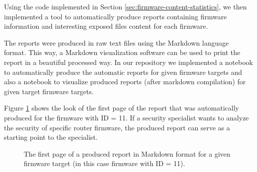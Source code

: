Using the code implemented in Section \ref{sec:firmware-content-statistics}, we then implemented a tool to automatically produce reports containing firmware information and interesting exposed files content for each firmware.

The reports were produced in raw text files using the Markdown language format. This way, a Markdown visualization software can be used to print the report in a beautiful processed way. In our repository \cite{github:c2dc-toso} we implemented a notebook to automatically produce the automatic reports for given firmware targets and also a notebook to visualize produced reports (after markdown compilation) for given target firmware targets.

Figure \ref{fig:automatic-report} shows the look of the first page of the report that was automatically produced for the firmware with ID = 11. If a security specialist wants to analyze the security of specific router firmware, the produced report can serve as a starting point to the specialist.

\begin{figure}[H]
    \centering
    \caption{The first page of a produced report in Markdown format for a given firmware target (in this case firmware with ID = 11).}
    \label{fig:automatic-report}
\end{figure}

